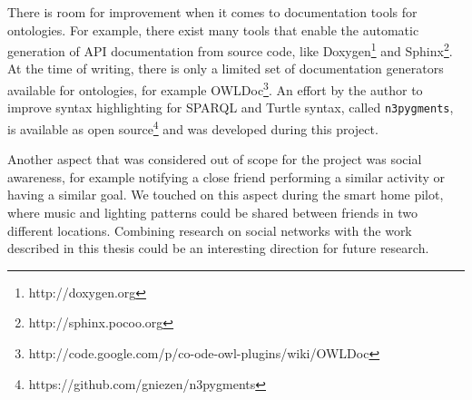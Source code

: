 There is room for improvement when it comes to documentation tools for ontologies. For example, there exist many tools that enable the automatic generation of \ac{API} documentation from source code, like Doxygen\footnote{http://doxygen.org} and Sphinx\footnote{http://sphinx.pocoo.org}. At the time of writing, there is only a limited set of documentation generators available for ontologies, for example OWLDoc\footnote{http://code.google.com/p/co-ode-owl-plugins/wiki/OWLDoc}. An effort by the author to improve syntax highlighting for \ac{SPARQL} and Turtle syntax, called \texttt{n3pygments}, is available as open source\footnote{https://github.com/gniezen/n3pygments} and was developed during this project.


Another aspect that was considered out of scope for the project was social awareness, for example notifying a close friend performing a similar activity or having a similar goal. We touched on this aspect during the smart home pilot, where music and lighting patterns could be shared between friends in two different locations. Combining research on social networks with the work described in this thesis could be an interesting direction for future research.




